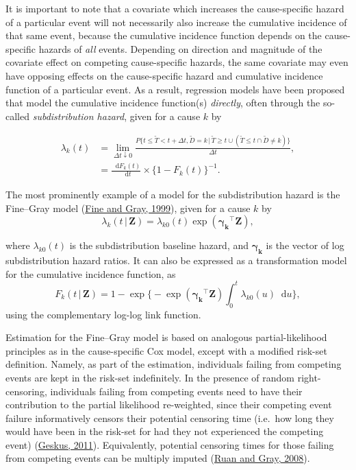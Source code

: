 \documentclass[
  letterpaper,
  DIV=11,
  numbers=noendperiod]{scrreprt}
\newcommand{\given}{\,|\,}
\newcommand\diff{\mathop{}\!\mathrm{d}}
\begin{document}
It is important to note that a covariate which increases the
cause-specific hazard of a particular event will not necessarily also
increase the cumulative incidence of that same event, because the
cumulative incidence function depends on the cause-specific hazards of
\emph{all} events. Depending on direction and magnitude of the covariate
effect on competing cause-specific hazards, the same covariate may even
have opposing effects on the cause-specific hazard and cumulative
incidence function of a particular event. As a result, regression models
have been proposed that model the cumulative incidence function(s)
\emph{directly}, often through the so-called \emph{subdistribution
hazard}, given for a cause \(k\) by

\[
\begin{aligned}
    \lambda_k(t) &= \lim_{\Delta t \downarrow 0} \frac{P\{t \leq \tilde{T} < t + \Delta t, \tilde{D} = k \given \tilde{T} \geq t \cup (\tilde{T} \leq t \cap \tilde{D} \neq k)\}}{\Delta t}, \\
    &= \frac{\diff F_k(t)}{\diff t} \times \{1 - F_k(t)\}^{-1}.
\end{aligned}
\]

The most prominently example of a model for the subdistribution hazard
is the Fine--Gray model
(\protect\hyperlink{ref-fineProportionalHazardsModel1999}{Fine and Gray,
1999}), given for a cause \(k\) by \[
\lambda_k(t \given \mathbf{Z}) = \lambda_{k0}(t)\exp(\boldsymbol{\gamma_k}^\intercal \mathbf{Z}),
\]

where \(\lambda_{k0}(t)\) is the subdistribution baseline hazard, and
\(\boldsymbol{\gamma_k}\) is the vector of log subdistribution hazard
ratios. It can also be expressed as a transformation model for the
cumulative incidence function, as \[
F_k(t \given \mathbf{Z}) = 1 - \exp \Biggl\{ -\exp(\boldsymbol{\gamma_k}^\intercal \mathbf{Z}) \int_{0}^{t} \lambda_{k0}(u)\diff u \Biggr\},
\] using the complementary log-log link function.

Estimation for the Fine--Gray model is based on analogous
partial-likelihood principles as in the cause-specific Cox model, except
with a modified risk-set definition. Namely, as part of the estimation,
individuals failing from competing events are kept in the risk-set
indefinitely. In the presence of random right-censoring, individuals
failing from competing events need to have their contribution to the
partial likelihood re-weighted, since their competing event failure
informatively censors their potential censoring time (i.e.~how long they
would have been in the risk-set for had they not experienced the
competing event)
(\protect\hyperlink{ref-geskusCauseSpecificCumulativeIncidence2011}{Geskus,
2011}). Equivalently, potential censoring times for those failing from
competing events can be multiply imputed
(\protect\hyperlink{ref-ruanAnalysesCumulativeIncidence2008}{Ruan and
Gray, 2008}).
\end{document}
